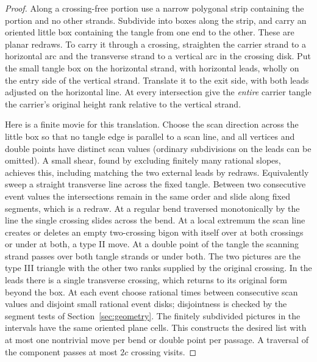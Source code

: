 \begin{proof}
Along a crossing-free portion use a narrow polygonal strip containing the portion and no other strands. Subdivide into boxes along the strip, and carry an oriented little box containing the tangle from one end to the other. These are planar redraws. To carry it through a crossing, straighten the carrier strand to a horizontal arc and the transverse strand to a vertical arc in the crossing disk. Put the small tangle box on the horizontal strand, with horizontal leads, wholly on the entry side of the vertical strand. Translate it to the exit side, with both leads adjusted on the horizontal line. At every intersection give the \emph{entire} carrier tangle the carrier's original height rank relative to the vertical strand.

Here is a finite movie for this translation. Choose the scan direction across the little box so that no tangle edge is parallel to a scan line, and all vertices and double points have distinct scan values (ordinary subdivisions on the leads can be omitted). A small shear, found by excluding finitely many rational slopes, achieves this, including matching the two external leads by redraws. Equivalently sweep a straight transverse line across the fixed tangle. Between two consecutive event values the intersections remain in the same order and slide along fixed segments, which is a redraw. At a regular bend traversed monotonically by the line the single crossing slides across the bend. At a local extremum the scan line creates or deletes an empty two-crossing bigon with itself over at both crossings or under at both, a type II move. At a double point of the tangle the scanning strand passes over both tangle strands or under both. The two pictures are the type III triangle with the other two ranks supplied by the original crossing. In the leads there is a single transverse crossing, which returns to its original form beyond the box. At each event choose rational times between consecutive scan values and disjoint small rational event disks; disjointness is checked by the segment tests of Section~\ref{sec:geometry}. The finitely subdivided pictures in the intervals have the same oriented plane cells. This constructs the desired list with at most one nontrivial move per bend or double point per passage. A traversal of the component passes at most $2c$ crossing visits.
\end{proof}


